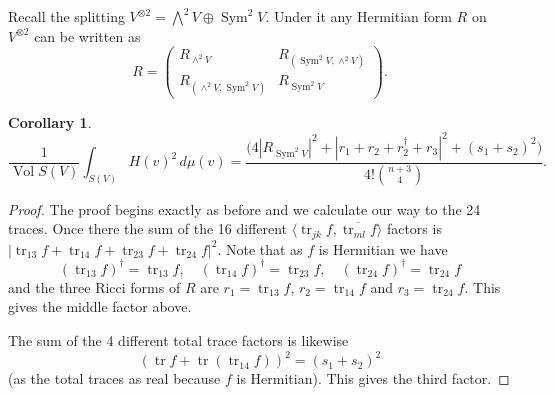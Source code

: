 \documentclass[10pt,a4paper]{amsart}
\newtheorem{coro}[theo]{Corollary}
\theoremstyle{definition}
\def\ov#1{\overline{#1}}
\def\d{\,d}
\DeclareMathOperator{\Sym}{Sym}
\DeclareMathOperator{\tr}{tr}
\DeclareMathOperator{\Vol}{Vol}
\begin{document}
Recall the splitting $V^{\otimes 2} = \bigwedge^2 V \oplus \Sym^2 V$.
Under it any Hermitian form $R$ on $V^{\otimes 2}$ can be written as
$$
R = \begin{pmatrix}
R_{\wedge^2 V} & R_{(\Sym^2V, \wedge^2 V)}
\\
R_{(\wedge^2 V, \Sym^2V)} & R_{\Sym^2 V}
\end{pmatrix}.
$$

\begin{coro}
$$
\frac{1}{\Vol S(V)} \int_{S(V)}
\!\!\!
H(v)^2  \d\mu(v)
= \frac{
\bigl(
4 |R_{\Sym^2 V}|^2
+ |r_1 + r_2 + r_2^\dagger + r_3|^2
+ (s_1 + s_2)^2
\bigr)
}{4! \binom{n+3}{4}}.
$$
\end{coro}

\begin{proof}
The proof begins exactly as before and we calculate our way to the 24 traces.
Once there
the sum of the 16 different $\langle \tr_{jk} f, \ov{\tr_{ml} f} \rangle$
factors is $|\!\tr_{13} f + \tr_{14} f + \tr_{23} f + \tr_{24} f|^2$.
Note that as $f$ is Hermitian we have
$$
(\tr_{13} f)^\dagger = \tr_{13} f,
\quad
(\tr_{14} f)^\dagger = \tr_{23} f,
\quad
(\tr_{24} f)^\dagger = \tr_{24} f
$$
and the three Ricci forms of $R$ are $r_1 = \tr_{13} f$, $r_2 = \tr_{14} f$ and
$r_3 = \tr_{24} f$.
This gives the middle factor above.

The sum of the 4 different total trace factors is likewise
$$
(\tr f + \tr(\tr_{14} f))^2 = (s_1 + s_2)^2
$$
(as the total traces as real because $f$ is Hermitian).
This gives the third factor.


\end{proof}
\end{document}

